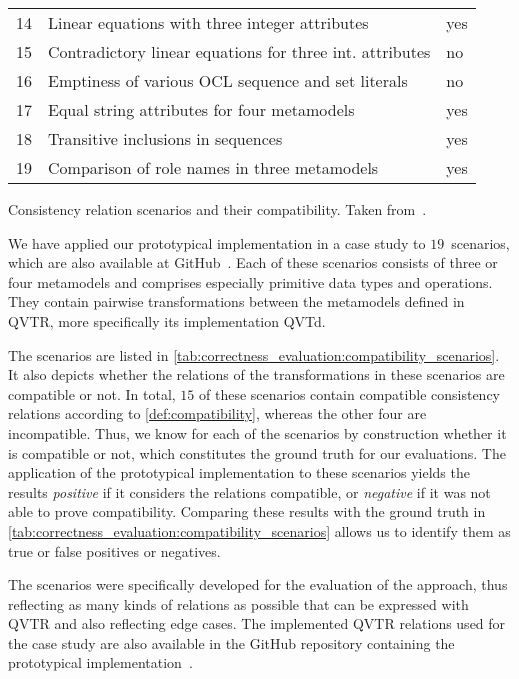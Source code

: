 \begin{propertable}
\begin{tabular}{L{1.4em} L{22.5em} C{5.7em}}
        14 & Linear equations with three integer attributes & yes\\
        15 & Contradictory linear equations for three int. attributes & no\\
        16 & Emptiness of various \gls{OCL} sequence and set literals & no\\
        17 & Equal string attributes for four metamodels & yes\\
        18 & Transitive inclusions in sequences & yes\\
        19 & Comparison of role names in three metamodels & yes\\
        \bottomrule
    \end{tabular}
    \caption[Example scenarios with compatibility classification]{Consistency relation scenarios and their compatibility. Taken from~.}
    \label{tab:correctness_evaluation:compatibility_scenarios}
\end{propertable}

We have applied our prototypical implementation in a case study to $19$~scenarios, which are also available at GitHub~\cite{decompositionGithub}.
Each of these scenarios consists of three or four metamodels and comprises especially primitive data types and operations.
They contain pairwise transformations between the metamodels defined in \gls{QVTR}, more specifically its implementation \gls{QVTd}.

The scenarios are listed in \autoref{tab:correctness_evaluation:compatibility_scenarios}.
It also depicts whether the relations of the transformations in these scenarios are compatible or not.
In total, $15$ of these scenarios contain compatible consistency relations according to \autoref{def:compatibility}, whereas the other four are incompatible.
Thus, we know for each of the scenarios by construction whether it is compatible or not, which constitutes the ground truth for our evaluations.
The application of the prototypical implementation to these scenarios yields the results \emph{positive} if it considers the relations compatible, or \emph{negative} if it was not able to prove compatibility.
Comparing these results with the ground truth in \autoref{tab:correctness_evaluation:compatibility_scenarios} allows us to identify them as true or false positives or negatives.

The scenarios were specifically developed for the evaluation of the approach, thus reflecting as many kinds of relations as possible that can be expressed with \gls{QVTR} and also reflecting edge cases.
The implemented \gls{QVTR} relations used for the case study are also available in the GitHub repository containing the prototypical implementation~\cite{decompositionGithub}.


